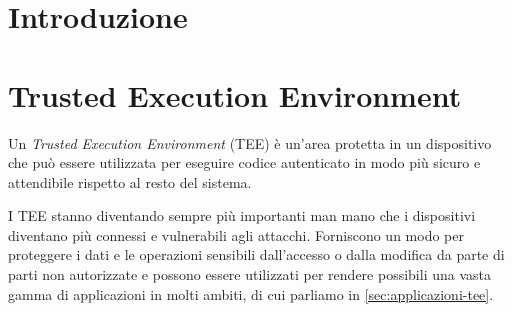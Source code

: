 \documentclass[12pt,italian]{report}
\begin{document}

% 


\chapter{Introduzione}
\label{sec:introduzione}


\chapter{Trusted Execution Environment}
\label{sec:tee}
Un \textit{Trusted Execution Environment} (TEE) è un'area protetta in un
dispositivo che può essere utilizzata per eseguire codice autenticato in modo
più sicuro e attendibile rispetto al resto del sistema.

I TEE stanno diventando sempre più importanti man mano che i dispositivi
diventano più connessi e vulnerabili agli attacchi.
Forniscono un modo per proteggere i dati e le operazioni sensibili
dall'accesso o dalla modifica da parte di parti non autorizzate e possono
essere utilizzati per rendere possibili una vasta gamma di applicazioni
in molti ambiti, di cui parliamo in \ref{sec:applicazioni-tee}.
\end{document}

